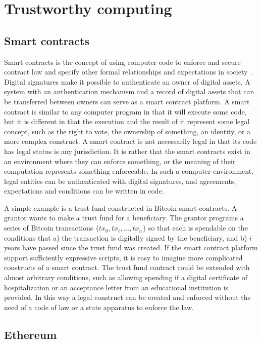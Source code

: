 \section{Trustworthy computing}
\label{sec:trustworthy}

\subsection{Smart contracts}

Smart contracts is the concept of using computer code to enforce and secure contract law and specify other formal relationships and expectations in  society~\cite{szabo_formalizing_1997}. Digital signatures make it possible to authenticate an owner of digital assets. A system with an authentication mechanism and a record of digital assets that can be transferred between owners can serve as a smart contract platform. A smart contract is similar to any computer program in that it will execute some code, but it is different in that the execution and the result of it represent some legal concept, such as the right to vote, the ownership of something, an identity, or a more complex construct. A smart contract is not necessarily legal in that its code has legal status is any jurisdiction. It is rather that the smart contracts exist in an environment where they can enforce something, or the meaning of their computation represents something enforceable. In such a computer environment, legal entities can be authenticated with digital signatures, and agreements, expectations and conditions can be written in code.

A simple example is a trust fund constructed in Bitcoin smart contracts. A grantor wants to make a trust fund for a beneficiary. The grantor programs a series of Bitcoin transactions $\{tx_0, tx_i, ..., tx_n\}$ so that each is spendable on the conditions that a) the transaction is digitally signed by the beneficiary, and b) $i$ years have passed since the trust fund was created. If the smart contract platform support sufficiently expressive scripts, it is easy to imagine more complicated constructs of a smart contract. The trust fund contract could be extended with almost arbitrary conditions, such as allowing spending if a digital certificate of hospitalization or an acceptance letter from an educational institution is provided. In this way a legal construct can be created and enforced without the need of a code of law or a state apparatus to enforce the law.

\subsection{Ethereum}

